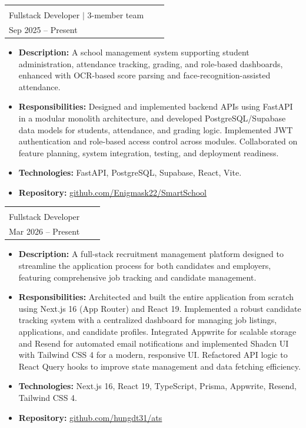 \documentclass[a4paper,12pt]{article}
\makeatletter
\newenvironment{joblong}[2]
    {
    \begin{tabularx}{\linewidth}{@{}l X r@{}}
    \textbf{#1} & \hfill &  #2 \\[3.75pt]
    \end{tabularx}
    \begin{minipage}[t]{\linewidth}
    \begin{itemize}[nosep,after=\strut, leftmargin=1em, itemsep=3pt,label=--]
    }
    {
    \end{itemize}
    \end{minipage}    
    }
\makeatother
\begin{document}
\begin{joblong}{{\shortstack[l]{SmartSchool -- Intelligent School Management System\\ Fullstack Developer $|$ 3-member team}}}{{\shortstack[r]{Graduation Thesis\\ Sep 2025 -- Present}}}
\item \textbf{Description:} A school management system supporting student administration, attendance tracking, grading, and role-based dashboards, enhanced with OCR-based score parsing and face-recognition-assisted attendance.
\item \textbf{Responsibilities:} Designed and implemented backend APIs using FastAPI in a modular monolith architecture, and developed PostgreSQL/Supabase data models for students, attendance, and grading logic. Implemented JWT authentication and role-based access control across modules. Collaborated on feature planning, system integration, testing, and deployment readiness.
\item \textbf{Technologies:} FastAPI, PostgreSQL, Supabase, React, Vite.
\item \textbf{Repository:} \href{https://github.com/Enigmask22/SmartSchool}{github.com/Enigmask22/SmartSchool}
\end{joblong}

\begin{joblong}{{\shortstack[l]{ATS -- Applicant Tracking System\\ Fullstack Developer}}}{{\shortstack[r]{Personal Project\\ Mar 2026 -- Present}}}
\item \textbf{Description:} A full-stack recruitment management platform designed to streamline the application process for both candidates and employers, featuring comprehensive job tracking and candidate management.
\item \textbf{Responsibilities:} Architected and built the entire application from scratch using Next.js 16 (App Router) and React 19. Implemented a robust candidate tracking system with a centralized dashboard for managing job listings, applications, and candidate profiles. Integrated Appwrite for scalable storage and Resend for automated email notifications and implemented Shadcn UI with Tailwind CSS 4 for a modern, responsive UI. Refactored API logic to React Query hooks to improve state management and data fetching efficiency.
\item \textbf{Technologies:} Next.js 16, React 19, TypeScript, Prisma, Appwrite, Resend, Tailwind CSS 4.
\item \textbf{Repository:} \href{https://github.com/hungdt31/ats}{github.com/hungdt31/ats}
\end{joblong}
\end{document}
